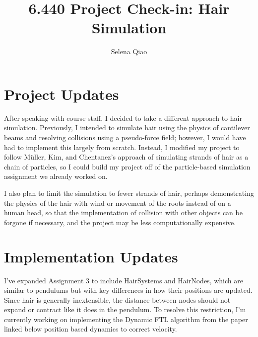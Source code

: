 \documentclass{article}
\begin{document}
\title{\vspace{-2cm}6.440 Project Check-in: Hair Simulation}
\author{Selena Qiao}
\maketitle


\section{Project Updates}

After speaking with course staff, I decided to take a different approach to hair simulation. Previously, I intended to simulate hair using the physics of cantilever beams and resolving collisions using a pseudo-force field; however, I would have had to implement this largely from scratch. Instead, I modified my project to follow Müller, Kim, and Chentanez's approach of simulating strands of hair as a chain of particles, so I could build my project off of the particle-based simulation assignment we already worked on.

I also plan to limit the simulation to fewer strands of hair, perhaps demonstrating the physics of the hair with wind or movement of the roots instead of on a human head, so that the implementation of collision with other objects can be forgone if necessary, and the project may be less computationally expensive.


\section{Implementation Updates}

I've expanded Assignment 3 to include HairSystems and HairNodes, which are similar to pendulums but with key differences in how their positions are updated. Since hair is generally inextensible, the distance between nodes should not expand or contract like it does in the pendulum. To resolve this restriction, I'm currently working on implementing the Dynamic FTL algorithm from the paper linked below position based dynamics to correct velocity.
\end{document}
